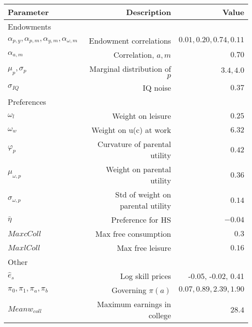 \begin{tabular}{lrr}
\hline
Parameter & Description  & Value  \\
\hline
Endowments &   &   \\
$\alpha_{p,y}, \alpha_{p,m}, \alpha_{y,m}, \alpha_{\omega,m}$ & Endowment correlations  & $0.01, 0.20, 0.74, 0.11$  \\
$\alpha_{a,m}$ & Correlation, $a,m$  & $0.70$  \\
$\mu_{p}, \sigma_{p}$ & Marginal distribution of $p$  & $3.4, 4.0$  \\
$\sigma_{IQ}$ & IQ noise  & $0.37$  \\
Preferences &   &   \\
$\omega_{l}$ & Weight on leisure  & $0.25$  \\
$\omega_{w}$ & Weight on u(c) at work  & $6.32$  \\
$\varphi_{p}$ & Curvature of parental utility  & $0.42$  \\
$\mu_{\omega,p}$ & Weight on parental utility  & $0.36$  \\
$\sigma_{\omega,p}$ & Std of weight on parental utility  & $0.14$  \\
$\bar{\eta}$ & Preference for HS  & $-0.04$  \\
$Max cColl$ & Max free consumption  & $0.3$  \\
$Max lColl$ & Max free leisure  & $0.16$  \\
Other &   &   \\
$\hat{e}_{s}$ & Log skill prices  & -0.05, -0.02, 0.41  \\
$\pi_{0}, \pi_{1}, \pi_{a}, \pi_{b}$ & Governing $\pi(a)$  & $0.07, 0.89, 2.39, 1.90$  \\
$Mean w_{coll}$ & Maximum earnings in college  & $28.4$  \\
\hline
\end{tabular}%
